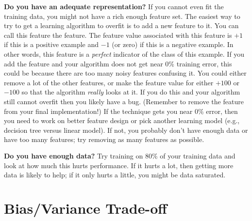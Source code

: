 \textbf{Do you have an adequate representation?}
If you cannot even fit the training data, you might not have a rich enough feature set.
The easiest way to try to get a learning algorithm to overfit is to
add a new feature to it.  You can call this feature the
 feature.  The feature value
associated with this feature is $+1$ if this is a positive example and
$-1$ (or zero) if this is a negative example.  In other words, this
feature is a \emph{perfect} indicator of the class of this example.
If you add the  feature and your algorithm does
not get near $0\%$ training error, this could be because there are too
many noisy features confusing it.  You could either remove a lot of
the other features, or make the feature value for 
either $+100$ or $-100$ so that the algorithm \emph{really} looks at
it.  If you do this and your algorithm still cannot overfit then you
likely have a bug.  (Remember to remove the 
feature from your final implementation!)
If the  technique gets you near 0\% error, then you need to work on better feature design or pick another learning model (e.g., decision tree versus linear model). If not, you probably don't have enough data or have too many features; try removing as many features as possible.

\textbf{Do you have enough data?} Try training on 80\% of your training data and look at how much this hurts performance. If it hurts a lot, then getting more data is likely to help; if it only hurts a little, you might be data saturated.



\section{Bias/Variance Trade-off}

